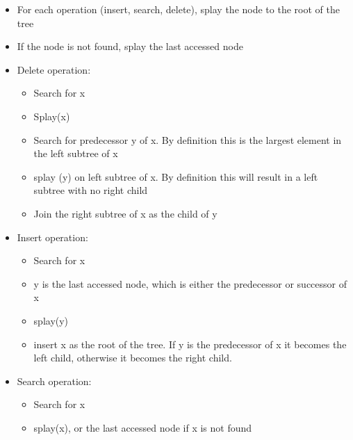 \begin{itemize}
    \item For each operation (insert, search, delete), splay the node to the root of the tree
    \item If the node is not found, splay the last accessed node
    \item Delete operation:
        \begin{itemize}
            \item Search for x
            \item Splay(x)
            \item Search for predecessor y of x. By definition this is the largest element in the left subtree of x
            \item splay (y) on left subtree of x. By definition this will result in a left subtree with no right child
            \item Join the right subtree of x as the child of y
        \end{itemize}
    \item Insert operation:
        \begin{itemize}
            \item Search for x
            \item y is the last accessed node, which is either the predecessor or successor of x
            \item splay(y)
            \item insert x as the root of the tree. If y is the predecessor of x it becomes the left child, otherwise it becomes the right child.
        \end{itemize}
    \item Search operation:
        \begin{itemize}
            \item Search for x
            \item splay(x), or the last accessed node if x is not found
        \end{itemize}
\end{itemize}




